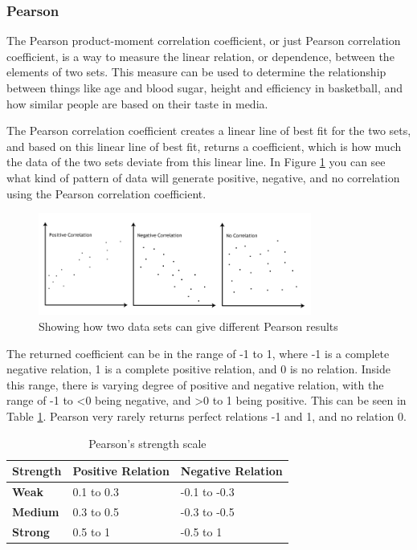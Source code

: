 \subsubsection{Pearson}

The Pearson product-moment correlation coefficient, or just Pearson correlation coefficient, is a way to measure the linear relation, or dependence, between the elements of two sets. This measure can be used to determine the relationship between things like age and blood sugar, height and efficiency in basketball, and how similar people are based on their taste in media. \cite{Pearson2}

The Pearson correlation coefficient creates a linear line of best fit for the two sets, and based on this linear line of best fit, returns a coefficient, which is how much the data of the two sets deviate from this linear line. In Figure \ref{Pearson2} you can see what kind of pattern of data will generate positive, negative, and no correlation using the Pearson correlation coefficient. \cite{Pearson2}

\begin{figure}[htb]
\centering
\includegraphics[width=0.8\textwidth]{Images/pearson2.png}
\caption{Showing how two data sets can give different Pearson results \cite{Pearson2}}
\label{Pearson2}
\end{figure}

The returned coefficient can be in the range of -1 to 1, where -1 is a complete negative relation, 1 is a complete positive relation, and 0 is no relation. Inside this range, there is varying degree of positive and negative relation, with the range of -1 to <0 being negative, and >0 to 1 being positive. This can be seen in Table \ref{PearsonStr}. Pearson very rarely returns perfect relations -1 and 1, and no relation 0. \cite{Pearson2}

\begin{table}[htb]
\centering
\begin{tabular}{|l|l|l|} \hline
	\textbf{Strength} & \textbf{Positive Relation} & \textbf{Negative Relation} \\ \hline
	\textbf{Weak} & 0.1 to 0.3 & -0.1 to -0.3 \\ \hline
	\textbf{Medium} & 0.3 to 0.5 & -0.3 to -0.5 \\ \hline
	\textbf{Strong} & 0.5 to 1 & -0.5 to 1 \\ \hline
\end{tabular}
\caption{Pearson's strength scale \cite{Pearson2}}
\label{PearsonStr}
\end{table}

